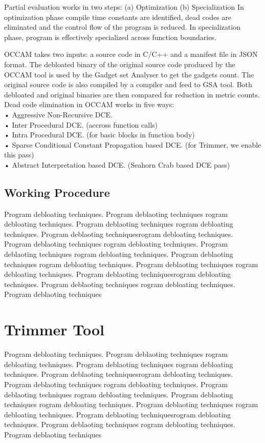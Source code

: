 \documentclass{relatorio}
\begin{document}
Partial evaluation works in two steps: (a) Optimization (b) Specialization
In optimization phase compile time constants are identified, dead codes are eliminated and the control flow of the program is reduced. In specialization phase, program is effectively specialized across function boundaries.

OCCAM takes two inputs: a source code in C/C++ and a manifest file in JSON format. The debloated binary of the original source code produced by the OCCAM tool 
is used by the Gadget set Analyser to get the gadgets count. The original source code is also compiled by a compiler and feed to GSA tool. Both debloated and original binaries are then compared for reduction in metric counts. Dead code elimination in OCCAM works in five ways:
\\
•	Aggressive Non-Recursive DCE.
\\
•	Inter Procedural DCE.
(accross function calls) \\
•	Intra Procedural DCE.
(for basic blocks in function body) \\
•	Sparse Conditional Constant Propagation based DCE.
(for Trimmer, we enable this pass) \\
•	Abstract Interpretation based DCE. (Seahorn Crab based DCE pass) \\

\subsection{Working Procedure}%
\label{Tools}

Program debloating techniques. Program deblaoting techniques rogram debloating techniques. Program deblaoting techniques
rogram debloating techniques. Program deblaoting techniquesrogram debloating techniques. Program deblaoting techniques
rogram debloating techniques. Program deblaoting techniques rogram debloating techniques. Program deblaoting techniques
rogram debloating techniques. Program deblaoting techniques 
rogram debloating techniques. Program deblaoting techniquesrogram debloating techniques. Program deblaoting techniques
rogram debloating techniques. Program deblaoting techniques

\section{Trimmer Tool}%
\label{Tools}

Program debloating techniques. Program deblaoting techniques rogram debloating techniques. Program deblaoting techniques
rogram debloating techniques. Program deblaoting techniquesrogram debloating techniques. Program deblaoting techniques
rogram debloating techniques. Program deblaoting techniques rogram debloating techniques. Program deblaoting techniques
rogram debloating techniques. Program deblaoting techniques 
rogram debloating techniques. Program deblaoting techniquesrogram debloating techniques. Program deblaoting techniques
rogram debloating techniques. Program deblaoting techniques
\end{document}

